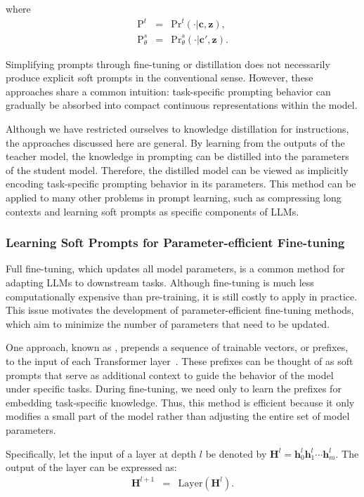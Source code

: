 \noindent where
\begin{eqnarray}
\mathrm{P}^t & = & \mathrm{Pr}^{t}(\cdot|\mathbf{c},\mathbf{z}), \\
\mathrm{P}^s_{\theta} & = & \mathrm{Pr}_{\theta}^{s}(\cdot|\mathbf{c}', \mathbf{z}).
\end{eqnarray}

Simplifying prompts through fine-tuning or distillation does not necessarily produce explicit soft prompts in the conventional sense. However, these approaches share a common intuition: task-specific prompting behavior can gradually be absorbed into compact continuous representations within the model.

Although we have restricted ourselves to knowledge distillation for instructions, the approaches discussed here are general. By learning from the outputs of the teacher model, the knowledge in prompting can be distilled into the parameters of the student model. Therefore, the distilled model can be viewed as implicitly encoding task-specific prompting behavior in its parameters. This method can be applied to many other problems in prompt learning, such as compressing long contexts and learning soft prompts as specific components of LLMs.

\subsubsection{Learning Soft Prompts for Parameter-efficient Fine-tuning}

\noindent Full fine-tuning, which updates all model parameters, is a common method for adapting LLMs to downstream tasks. Although fine-tuning is much less computationally expensive than pre-training, it is still costly to apply in practice. This issue motivates the development of parameter-efficient fine-tuning methods, which aim to minimize the number of parameters that need to be updated.

One approach, known as , prepends a sequence of trainable vectors, or prefixes, to the input of each Transformer layer~\cite{li-liang:2021prefix}. These prefixes can be thought of as soft prompts that serve as additional context to guide the behavior of the model under specific tasks. During fine-tuning, we need only to learn the prefixes for embedding task-specific knowledge. Thus, this method is efficient because it only modifies a small part of the model rather than adjusting the entire set of model parameters.

Specifically, let the input of a layer at depth $l$ be denoted by $\mathbf{H}^l = \mathbf{h}_0^l \mathbf{h}_1^l \cdots \mathbf{h}_m^l$. The output of the layer can be expressed as:
\begin{eqnarray}
\mathbf{H}^{l+1} & = & \mathrm{Layer}(\mathbf{H}^{l}).
\end{eqnarray}

